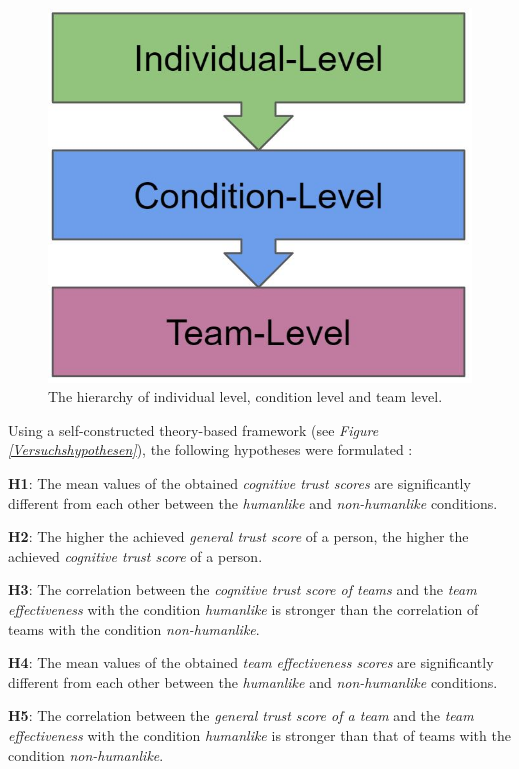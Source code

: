 \documentclass[sigchi]{acmart}
\begin{document}
\begin{figure}[h]
  \centering
 		\includegraphics[width=0.5\linewidth]{Abbildungen/DifferentLevels.JPG}	
			\caption[The hierarchy levels]{The hierarchy of individual level, condition level and team level.}
			\label{DifferentLevels}
\end{figure}	
	
Using a self-constructed theory-based framework (see \textit{Figure \ref{Versuchshypothesen}}), the following hypotheses were formulated :

\textbf{H1}: The mean values of the obtained \textit{cognitive trust scores} are significantly different from each other between the \textit{humanlike} and \textit{non-humanlike} conditions.

\textbf{H2}: The higher the achieved \textit{general trust score} of a person, the higher the achieved \textit{cognitive trust score} of a person.

\textbf{H3}: The correlation between the \textit{cognitive trust score of teams} and the \textit{team effectiveness} with the condition \textit{humanlike} is stronger than the correlation of teams with the condition \textit{non-humanlike}.

\textbf{H4}: The mean values of the obtained \textit{team effectiveness scores} are significantly different from each other between the \textit{humanlike} and \textit{non-humanlike} conditions.

\textbf{H5}: The correlation between the \textit{general trust score of a team} and the \textit{team effectiveness} with the condition \textit{humanlike} is stronger than that of teams with the condition \textit{non-humanlike}.
\end{document}

